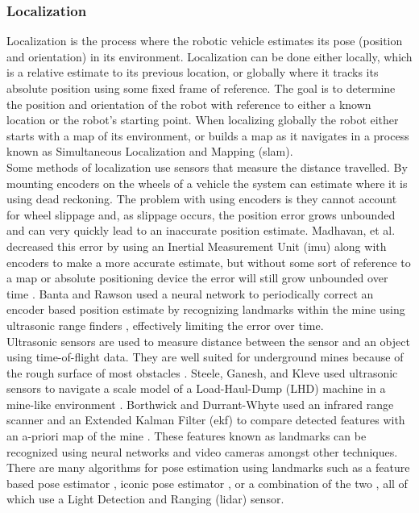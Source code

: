 \subsubsection{Localization}
\label{sec:local}

Localization is the process where the robotic vehicle estimates its pose (position and orientation) in its environment. Localization can be done either locally, which is a relative estimate to its previous location, or globally where it tracks its absolute position using some fixed frame of reference. The goal is to determine the position and orientation of the robot with reference to either a known location or the robot's starting point. When localizing globally the robot either starts with a map of its environment, or builds a map as it navigates in a process known as Simultaneous Localization and Mapping (\acrshort{slam}).\\

Some methods of localization use sensors that measure the distance travelled. By mounting encoders on the wheels of a vehicle the system can estimate where it is using dead reckoning. The problem with using encoders is they cannot account for wheel slippage and, as slippage occurs, the position error grows unbounded and can very quickly lead to an inaccurate position estimate. Madhavan, et al. decreased this error by using an Inertial Measurement Unit (\acrshort{imu}) along with encoders to make a more accurate estimate, but without some sort of reference to a map or absolute positioning device the error will still grow unbounded over time \cite{madhavan}. Banta and Rawson used a neural network to periodically correct an encoder based position estimate by recognizing landmarks within the mine using ultrasonic range finders \cite{fusion}, effectively limiting the error over time.\\

Ultrasonic sensors are used to measure distance between the sensor and an object using time-of-flight data. They are well suited for underground mines because of the rough surface of most obstacles \cite{proof}. Steele, Ganesh, and Kleve used ultrasonic sensors to navigate a scale model of a Load-Haul-Dump (LHD) machine in a mine-like environment \cite{ganesh}. Borthwick and Durrant-Whyte used an infrared range scanner and an Extended Kalman Filter (\acrshort{ekf}) to compare detected features with an a-priori map of the mine \cite{borth}. These features known as landmarks can be recognized using neural networks \cite{neural} and video cameras \cite{video} amongst other techniques. There are many algorithms for pose estimation using landmarks such as a feature based pose estimator \cite{feature}, iconic pose estimator \cite{iconic}, or a combination of the two \cite{both}, all of which use a Light Detection and Ranging (\acrshort{lidar}) sensor.\\

